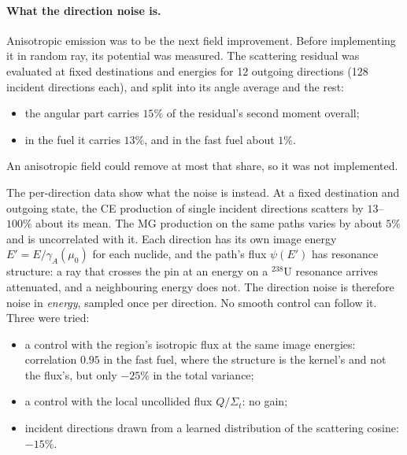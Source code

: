 \paragraph{What the direction noise is.} Anisotropic emission was to be the next field improvement.
Before implementing it in random ray, its potential was measured. The scattering residual was
evaluated at fixed destinations and energies for 12 outgoing directions (128 incident directions
each), and split into its angle average and the rest:
\begin{itemize}
\item the angular part carries $15\%$ of the residual's second moment overall;
\item in the fuel it carries $13\%$, and in the fast fuel about $1\%$.
\end{itemize}
An anisotropic field could remove at most that share, so it was not implemented.

The per-direction data show what the noise is instead. At a fixed destination and outgoing state,
the CE production of single incident directions scatters by $13$--$100\%$ about its mean. The MG
production on the same paths varies by about $5\%$ and is uncorrelated with it. Each direction has
its own image energy $E'=E/\gamma_A(\mu_0)$ for each nuclide, and the path's flux $\psi(E')$ has
resonance structure: a ray that crosses the pin at an energy on a $^{238}$U resonance arrives
attenuated, and a neighbouring energy does not. The direction noise is therefore noise in
\emph{energy}, sampled once per direction. No smooth control can follow it. Three were tried:
\begin{itemize}
\item a control with the region's isotropic flux at the same image energies: correlation $0.95$ in
  the fast fuel, where the structure is the kernel's and not the flux's, but only $-25\%$ in the
  total variance;
\item a control with the local uncollided flux $Q/\Sigma_t$: no gain;
\item incident directions drawn from a learned distribution of the scattering cosine: $-15\%$.
\end{itemize}

